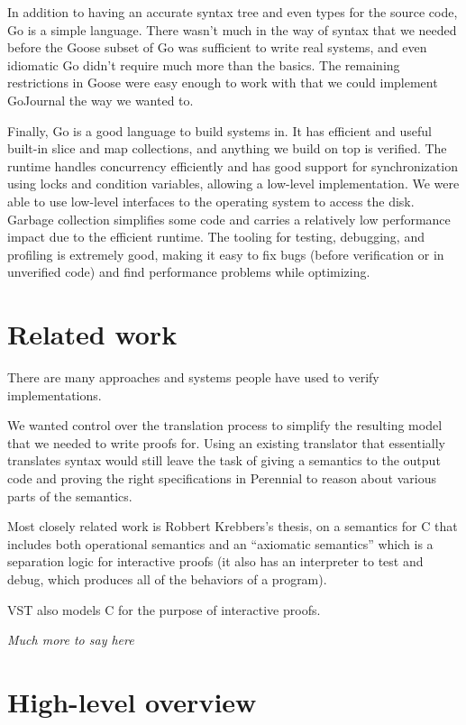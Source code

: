 In addition to having an accurate syntax tree and even types for the
source code, Go is a simple language. There wasn't much in the way of
syntax that we needed before the Goose subset of Go was sufficient to
write real systems, and even idiomatic Go didn't require much more than
the basics. The remaining restrictions in Goose were easy enough to work
with that we could implement GoJournal the way we wanted to.

Finally, Go is a good language to build systems in. It has efficient and
useful built-in slice and map collections, and anything we build on top
is verified. The runtime handles concurrency efficiently and has good
support for synchronization using locks and condition variables,
allowing a low-level implementation. We were able to use low-level
interfaces to the operating system to access the disk. Garbage
collection simplifies some code and carries a relatively low performance
impact due to the efficient runtime. The tooling for testing, debugging,
and profiling is extremely good, making it easy to fix bugs (before
verification or in unverified code) and find performance problems while
optimizing.

\section{Related work}

There are many approaches and systems people have used to verify
implementations.

We wanted control over the translation process to simplify the resulting
model that we needed to write proofs for. Using an existing translator
that essentially translates syntax would still leave the task of giving
a semantics to the output code and proving the right specifications in
Perennial to reason about various parts of the semantics.

Most closely related work is Robbert Krebbers's thesis, on a semantics
for C that includes both operational semantics and an ``axiomatic
semantics'' which is a separation logic for interactive proofs (it also
has an interpreter to test and debug, which produces all of the
behaviors of a program).

VST also models C for the purpose of interactive proofs.

\emph{Much more to say here}

\section{High-level overview}

